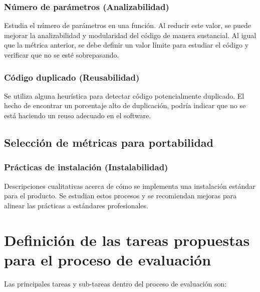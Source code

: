 \subsubsection{Número de parámetros (Analizabilidad)}
Estudia el número de parámetros en una función.
Al reducir este valor, se puede mejorar la analizabilidad y modularidad del código de manera sustancial.
Al igual que la métrica anterior, se debe definir un valor límite para estudiar el código y verificar que
no se esté sobrepasando.

\subsubsection{Código duplicado (Reusabilidad)}

Se utiliza alguna heurística para detectar código potencialmente duplicado.
El hecho de encontrar un porcentaje alto de duplicación, podría indicar que no se está haciendo un reuso 
adecuado en el software.

\subsection{Selección de métricas para portabilidad}

\subsubsection{Prácticas de instalación (Instalabilidad)}

Descripciones cualitativas acerca de cómo se implementa una instalación estándar para el producto. 
Se estudian estos procesos y se recomiendan mejoras para alinear las prácticas a estándares profesionales.

\section{Definición de las tareas propuestas para el proceso de evaluación}

Las principales tareas y sub-tareas dentro del proceso de evaluación son:


